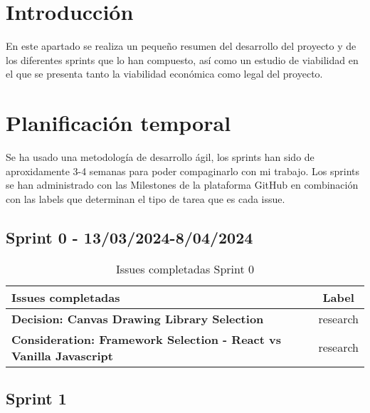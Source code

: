 
\section{Introducción}
En este apartado se realiza un pequeño resumen del desarrollo del proyecto y de los diferentes sprints que lo han compuesto, así como un estudio de viabilidad en el que se presenta tanto la viabilidad económica como legal del proyecto.

\section{Planificación temporal}
Se ha usado una metodología de desarrollo ágil, los sprints han sido de aproxidamente 3-4 semanas para poder compaginarlo con mi trabajo.
Los sprints se han administrado con las Milestones de la plataforma GitHub en combinación con las labels que determinan el tipo de tarea que es cada issue.

\subsection{Sprint 0 - 13/03/2024-8/04/2024 }
\begin{table}[ht!]
    \centering
    \resizebox{14cm}{!} {
    \begin{tabular}{|l|c|}
    \hline
    \rowcolor[rgb]{0.9, 0.9, 0.9}
    \textbf{Issues completadas} & \textbf{Label} \\ \hline
    \textbf{Decision: Canvas Drawing Library Selection} & \cellcolor[rgb]{0.83, 0.77, 0.97}research \\ \hline 
    \textbf{Consideration: Framework Selection - React vs Vanilla Javascript} & \cellcolor[rgb]{0.83, 0.77, 0.97}research \\ \hline 
    \end{tabular}}
    \caption{Issues completadas Sprint 0}
    \label{tab:my_label}
\end{table}




\subsection{Sprint 1}

